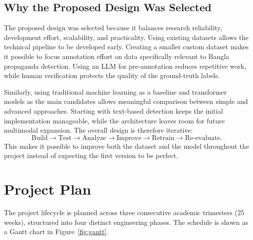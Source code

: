\subsection{Why the Proposed Design Was Selected}
The proposed design was selected because it balances research reliability,
development effort, scalability, and practicality. Using existing datasets allows
the technical pipeline to be developed early. Creating a smaller custom dataset
makes it possible to focus annotation effort on data specifically relevant to
Bangla propaganda detection. Using an LLM for pre-annotation reduces repetitive
work, while human verification protects the quality of the ground-truth labels.

Similarly, using traditional machine learning as a baseline and transformer models
as the main candidates allows meaningful comparison between simple and advanced
approaches. Starting with text-based detection keeps the initial implementation
manageable, while the architecture leaves room for future multimodal expansion.
The overall design is therefore iterative:
\[\text{Build}\rightarrow\text{Test}\rightarrow\text{Analyze}\rightarrow\text{Improve}\rightarrow\text{Retrain}\rightarrow\text{Re-evaluate}.\]
This makes it possible to improve both the dataset and the model throughout the
project instead of expecting the first version to be perfect.

\section{Project Plan}
\label{sec:plan}
The project lifecycle is planned across three consecutive academic trimesters
(25 weeks), structured into four distinct engineering phases. The schedule is shown
as a Gantt chart in Figure~\ref{fig:gantt}.

